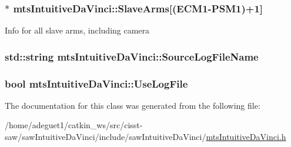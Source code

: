 \hypertarget{classmts_intuitive_da_vinci_ad974917d88b89bca109656a8e1ab7238}{
\subsubsection[{Slave\-Arms}]{$\ast$ mts\-Intuitive\-Da\-Vinci\-::\-Slave\-Arms\mbox{[}({\bf E\-C\-M1}-\/{\bf P\-S\-M1})+1\mbox{]}\hspace{0.3cm}{\ttfamily [protected]}}}\label{classmts_intuitive_da_vinci_ad974917d88b89bca109656a8e1ab7238}
Info for all slave arms, including camera \hypertarget{classmts_intuitive_da_vinci_abd697468b4bd68e40664e73ca6af5692}{
\subsubsection[{Source\-Log\-File\-Name}]{\setlength{\rightskip}{0pt plus 5cm}std\-::string mts\-Intuitive\-Da\-Vinci\-::\-Source\-Log\-File\-Name\hspace{0.3cm}{\ttfamily [protected]}}}\label{classmts_intuitive_da_vinci_abd697468b4bd68e40664e73ca6af5692}
\hypertarget{classmts_intuitive_da_vinci_a19a2398dbc1a8369da7295119fb8abbc}{
\subsubsection[{Use\-Log\-File}]{\setlength{\rightskip}{0pt plus 5cm}bool mts\-Intuitive\-Da\-Vinci\-::\-Use\-Log\-File\hspace{0.3cm}{\ttfamily [protected]}}}\label{classmts_intuitive_da_vinci_a19a2398dbc1a8369da7295119fb8abbc}


The documentation for this class was generated from the following file\-:\begin{DoxyCompactItemize}
\item 
/home/adeguet1/catkin\-\_\-ws/src/cisst-\/saw/saw\-Intuitive\-Da\-Vinci/include/saw\-Intuitive\-Da\-Vinci/\hyperlink{mts_intuitive_da_vinci_8h}{mts\-Intuitive\-Da\-Vinci.\-h}\end{DoxyCompactItemize}
